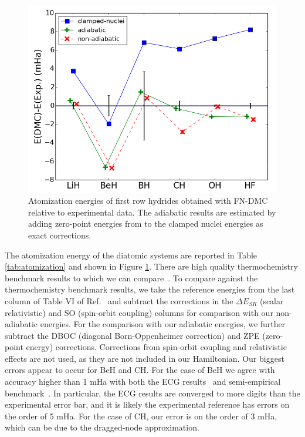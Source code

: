 \documentclass[pra,superscriptaddress,groupedaddress,twocolumn]{revtex4}
\begin{document}
\begin{figure}[h]
\centering
\includegraphics[scale=.4]{Figures/atomization}
\caption{Atomization energies of first row hydrides obtained with FN-DMC relative to experimental data. The adiabatic results are estimated by adding zero-point energies from \cite{Feller_Corrections} to the clamped nuclei energies as exact corrections. \label{fig:atomization}}
\end{figure}

The atomization energy of the diatomic systems are reported in Table \ref{tab:atomization} and shown in Figure \ref{fig:atomization}. There are high quality thermochemistry benchmark results to which we can compare~\cite{Feller_Corrections}. To compare against the thermochemistry benchmark results, we take the reference energies from the last column of Table VI of Ref.~\cite{Feller_Corrections} and subtract the corrections in the $\Delta E_{SR}$ (scalar relativistic) and SO (spin-orbit coupling) columns for comparison with our non-adiabatic energies. For the comparison with our adiabatic energies, we further subtract the DBOC (diagonal Born-Oppenheimer correction) and ZPE (zero-point energy) corrections. Corrections from spin-orbit coupling and relativistic effects are not used, as they are not included in our Hamiltonian. Our biggest errors appear to occur for BeH and CH. For the case of BeH we agree with accuracy higher than 1 mHa with both the ECG results~\cite{Bubin_BeH_noBO} and semi-empirical benchmark~\cite{Feller_Corrections,Davidson_Atoms}. In particular, the ECG results are converged to more digits than the experimental error bar, and it is likely the experimental reference has errors on the order of 5 mHa. For the case of CH, our error is on the order of 3 mHa, which can be due to the dragged-node approximation. 
\end{document}
